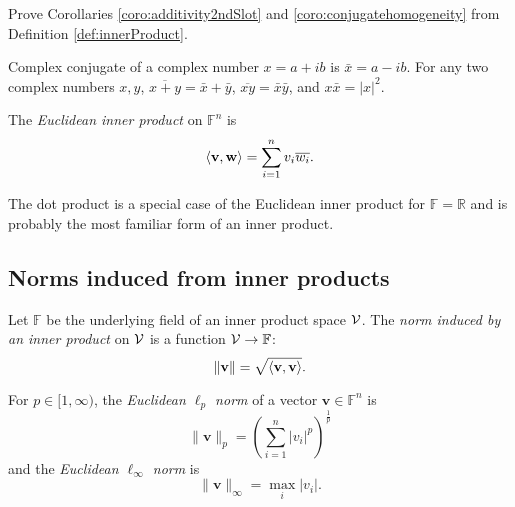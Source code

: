 \begin{exc}
  Prove Corollaries \ref{coro:additivity2ndSlot}
  and \ref{coro:conjugatehomogeneity}
  from Definition \ref{def:innerProduct}.
\end{exc}
\begin{solution}
  Complex conjugate of a complex number $x=a+ib$
  is $\bar{x}=a-ib$.
  For any two complex numbers $x,y$, $\overline{x+y}=\bar{x}+\bar{y}$,
  $\overline{xy}=\bar{x}\bar{y}$,
  and $x\bar{x}=|x|^2$.
\end{solution}

\begin{defn}
  \label{def:EuclideanInnerProduct}
  The \emph{Euclidean inner product} on $\mathbb{F}^n$ is 
  \begin{equation}
    \label{eq:EuclideanInnerProduct}
    \left\langle \mathbf{v},\mathbf{w} \right\rangle = \sum_{i=1}^n v_i\overline{w_i}.
  \end{equation}
\end{defn}

\begin{rem}
  The dot product is a special case of
  the Euclidean inner product for $\mathbb{F}=\mathbb{R}$
  and is probably the most familiar form of an inner product.
\end{rem}

\subsection{Norms induced from inner products}
\label{sec:norms-induced-from}

\begin{defn}
  \label{def:inducedNorm}
  Let $\mathbb{F}$ be the underlying field of
  an inner product space ${\cal V}$.
  The \emph{norm induced by an inner product} on ${\cal V}$
  is a function ${\cal V}\rightarrow\mathbb{F}$:
  \begin{equation}
    \label{eq:inducedNorm}
    \|\mathbf{v}\|=\sqrt{\left\langle \mathbf{v},\mathbf{v} \right\rangle}.
  \end{equation}
\end{defn}

\begin{defn}
  \label{def:EuclideanLpNorm}
  For $p\in [1,\infty)$, the \emph{Euclidean $\ell_p$ norm}
  of a vector $\mathbf{v}\in\mathbb{F}^n$ is
  \begin{equation}
    \label{eq:EuclideanLpNorm}
    \|\mathbf{v}\|_p= \left(\sum_{i=1}^n |v_i|^p\right)^{\frac{1}{p}}
  \end{equation}
  and the \emph{Euclidean $\ell_{\infty}$ norm} is 
  \begin{equation}
    \label{eq:EuclideanLinfNorm}
    \|\mathbf{v}\|_{\infty}= \max_{i} |v_i|.
  \end{equation}
\end{defn}

